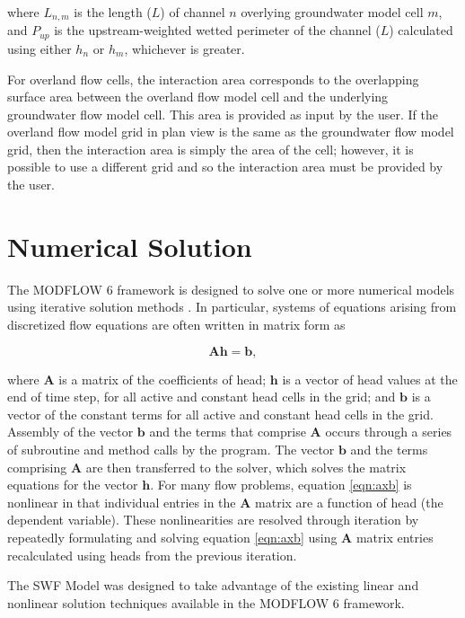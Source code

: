 \documentclass[fleqn]{article}
\newcommand{\matr}[1]{\mathbf{#1}}
\begin{document}
\noindent where $L_{n,m}$ is the length ($L$) of channel $n$ overlying groundwater model cell $m$, and $P_{up}$ is the upstream-weighted wetted perimeter of the channel ($L$) calculated using either $h_n$ or $h_m$, whichever is greater.

For overland flow cells, the interaction area corresponds to the overlapping surface area between the overland flow model cell and the underlying groundwater flow model cell.  This area is provided as input by the user.  If the overland flow model grid in plan view is the same as the groundwater flow model grid, then the interaction area is simply the area of the cell; however, it is possible to use a different grid and so the interaction area must be provided by the user.

\section{Numerical Solution}

The MODFLOW 6 framework is designed to solve one or more numerical models using iterative solution methods \cite{modflow6framework}.  In particular, systems of equations arising from discretized flow equations are often written in matrix form as

\begin{equation}
\label{eqn:axb}
\matr{A h} = \matr{b},
\end{equation}

\noindent where $\matr{A}$ is a matrix of the coefficients of head; $\matr{h}$ is a vector of head values at the end of time step, for all active and constant head cells in the grid; and $\matr{b}$ is a vector of the constant terms for all active and constant head cells in the grid. Assembly of the vector $\matr{b}$ and the terms that comprise $\matr{A}$ occurs through a series of subroutine and method calls by the program. The vector $\matr{b}$ and the terms comprising $\matr{A}$ are then transferred to the solver, which solves the matrix equations for the vector $\matr{h}$. For many flow problems, equation \ref{eqn:axb} is nonlinear in that individual entries in the $\matr{A}$ matrix are a function of head (the dependent variable).  These nonlinearities are resolved through iteration by repeatedly formulating and solving equation \ref{eqn:axb} using $\matr{A}$ matrix entries recalculated using heads from the previous iteration.

The SWF Model was designed to take advantage of the existing linear and nonlinear solution techniques available in the MODFLOW 6 framework.  
\end{document}
